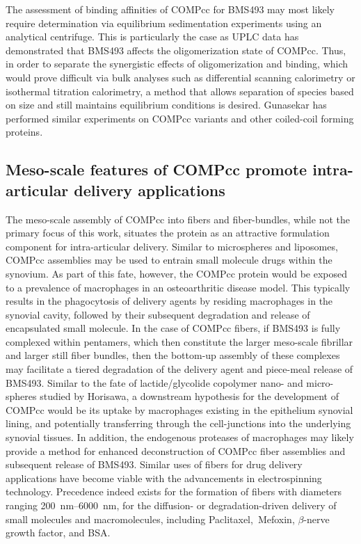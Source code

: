 \begin{refsection}
The assessment of binding affinities of COMPcc for BMS493 may most likely
require determination via equilibrium sedimentation experiments using an
analytical centrifuge. This is particularly the case as UPLC data has
demonstrated that BMS493 affects the oligomerization state of COMPcc. Thus, in
order to separate the synergistic effects of oligomerization and binding, which
would prove difficult via bulk analyses such as differential scanning
calorimetry or isothermal titration calorimetry, a method that allows separation
of species based on size and still maintains equilibrium conditions is desired.
Gunasekar has performed similar experiments on COMPcc
variants and other coiled-coil forming proteins.\cite{Gunasekar2009,Fletcher2012} 

\subsection{Meso-scale features of COMPcc promote intra-articular delivery
applications}
\label{sec:invivo_fate}
The meso-scale assembly of COMPcc into fibers and fiber-bundles, while not the
primary focus of this work, situates the protein as an attractive formulation
component for intra-articular delivery.\cite{Gerwin2006} Similar to
microspheres and liposomes, COMPcc assemblies may be used to entrain small
molecule drugs within the synovium. As part of this fate, however, the COMPcc
protein would be exposed to a prevalence of macrophages in an osteoarthritic
disease model. This typically results in the phagocytosis of delivery agents by
residing macrophages in the synovial cavity,
followed by their subsequent degradation and release of encapsulated small
molecule. In the case of COMPcc fibers, if BMS493 is fully complexed within
pentamers, which then constitute the larger meso-scale fibrillar and larger
still fiber bundles, then the bottom-up assembly of these complexes may
facilitate a tiered degradation of the delivery agent and piece-meal release of
BMS493. Similar to the fate of \iupac{\D\L-}lactide/glycolide copolymer nano-
and micro-spheres studied by Horisawa,\cite{Horisawa2002} a downstream
hypothesis for the development of COMPcc would be its uptake by macrophages
existing in the epithelium synovial lining, and potentially transferring through
the cell-junctions into the underlying synovial tissues. In addition, the
endogenous proteases of macrophages may likely provide a method for enhanced
deconstruction of COMPcc fiber assemblies and subsequent release of BMS493.
Similar uses of fibers for drug delivery applications have become viable with
the advancements in electrospinning technology.\cite{Sill2008} Precedence indeed
exists for the formation of fibers with diameters ranging
\SIrange{200}{6000}{\nm}, for the diffusion- or degradation-driven delivery of
small molecules and macromolecules, including Paclitaxel,\ Mefoxin,
${\beta}$-nerve growth factor, and BSA.\cite{Liang2005,Chew2005,Xu2006a}


\end{refsection}
